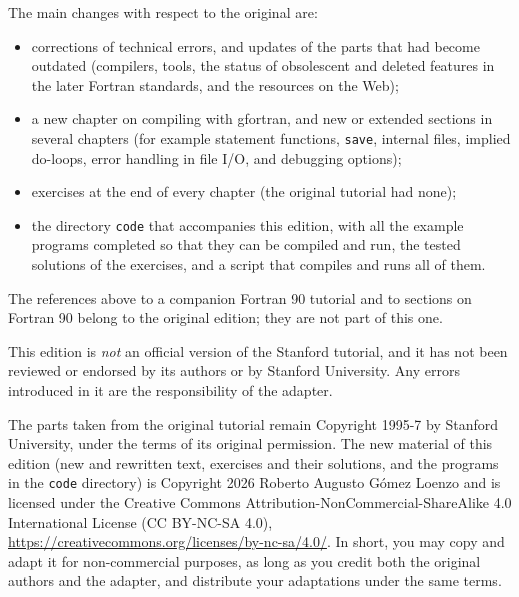 The main changes with respect to the original are:

\begin{itemize}
    \item corrections of technical errors, and updates of the parts that had become outdated (compilers, tools, the status of obsolescent and deleted features in the later Fortran standards, and the resources on the Web);
    \item a new chapter on compiling with gfortran, and new or extended sections in several chapters (for example statement functions, \texttt{save}, internal files, implied do-loops, error handling in file I/O, and debugging options);
    \item exercises at the end of every chapter (the original tutorial had none);
    \item the directory \texttt{code} that accompanies this edition, with all the example programs completed so that they can be compiled and run, the tested solutions of the exercises, and a script that compiles and runs all of them.
\end{itemize}

The references above to a companion Fortran 90 tutorial and to sections on Fortran 90 belong to the original edition; they are not part of this one.

This edition is \emph{not} an official version of the Stanford tutorial, and it has not been reviewed or endorsed by its authors or by Stanford University. Any errors introduced in it are the responsibility of the adapter.

The parts taken from the original tutorial remain Copyright \textcopyright{} \mbox{1995-7} by Stanford University, under the terms of its original permission. The new material of this edition (new and rewritten text, exercises and their solutions, and the programs in the \texttt{code} directory) is Copyright \textcopyright{} 2026 Roberto Augusto G\'omez Loenzo and is licensed under the Creative Commons Attribution-NonCommercial-ShareAlike 4.0 International License (CC BY-NC-SA 4.0), \url{https://creativecommons.org/licenses/by-nc-sa/4.0/}. In short, you may copy and adapt it for non-commercial purposes, as long as you credit both the original authors and the adapter, and distribute your adaptations under the same terms.
